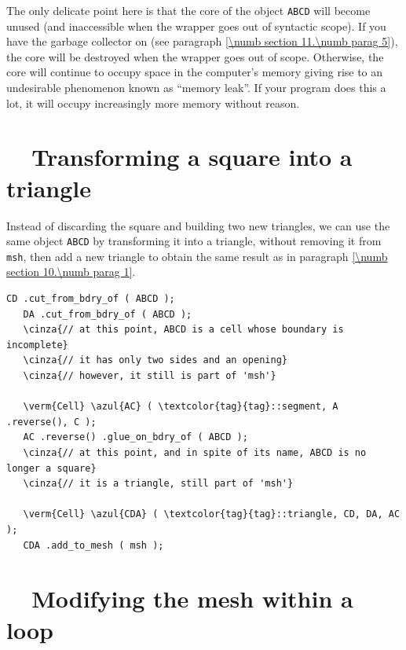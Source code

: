 The only delicate point here is that the core of the {\small\tt{}} object
{\small\tt ABCD}
will become unused (and inaccessible when the wrapper goes out of syntactic scope).
If you have the garbage collector on (see paragraph \ref{\numb section 11.\numb parag 5}),
the core will be destroyed when the wrapper goes out of scope.
Otherwise, the core will continue to occupy space in the computer's memory giving rise
to an undesirable phenomenon known as ``memory leak''.
If your program does this a lot, it will occupy increasingly more memory without reason.


\section{~~{Transforming a square into a triangle}}\label{\numb section 10.\numb parag 2}

Instead of discarding the square and building two new triangles, we can use the same
{\small\tt{}} object {\small\tt ABCD}
by transforming it into a triangle, without removing it from {\small\tt msh}, then add
a new triangle to obtain the same result as in paragraph \ref{\numb section 10.\numb parag 1}.

\begin{Verbatim}[commandchars=\\\{\},formatcom=\small\tt,frame=single,
   label=parag-\ref{\numb section 10.\numb parag 2}.cpp,rulecolor=\color{moldura},
   baselinestretch=0.94,framesep=2mm]
   CD .cut_from_bdry_of ( ABCD );
   DA .cut_from_bdry_of ( ABCD );
   \cinza{// at this point, ABCD is a cell whose boundary is incomplete}
   \cinza{// it has only two sides and an opening}
   \cinza{// however, it still is part of 'msh'}

   \verm{Cell} \azul{AC} ( \textcolor{tag}{tag}::segment, A .reverse(), C );
   AC .reverse() .glue_on_bdry_of ( ABCD );
   \cinza{// at this point, and in spite of its name, ABCD is no longer a square}
   \cinza{// it is a triangle, still part of 'msh'}

   \verm{Cell} \azul{CDA} ( \textcolor{tag}{tag}::triangle, CD, DA, AC );
   CDA .add_to_mesh ( msh );
\end{Verbatim}



\section{~~Modifying the mesh within a loop}\label{\numb section 10.\numb parag 3}

